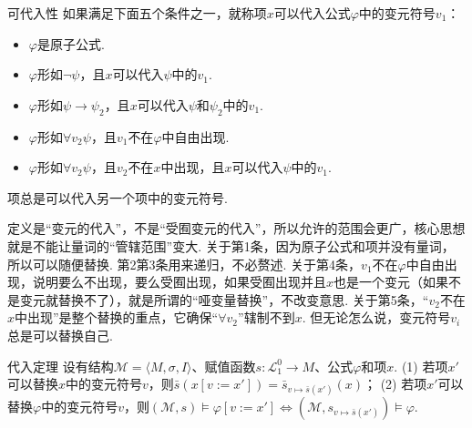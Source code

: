 \begin{definition}{可代入性}
    如果满足下面五个条件之一，就称项\(x\)可以代入公式\(\varphi\)中的变元符号\(v_1\)：
    \begin{itemize}
        \item \(\varphi\)是原子公式.
        \item \(\varphi\)形如\(\neg \psi\)，且\(x\)可以代入\(\psi\)中的\(v_1\).
        \item \(\varphi\)形如\(\psi \to \psi_2\)，且\(x\)可以代入\(\psi\)和\(\psi_2\)中的\(v_1\).
        \item \(\varphi\)形如\(\forall v_2 \psi\)，且\(v_1\)不在\(\varphi\)中自由出现.
        \item \(\varphi\)形如\(\forall v_2 \psi\)，且\(v_2\)不在\(x\)中出现，且\(x\)可以代入\(\psi\)中的\(v_1\).
    \end{itemize}
    项总是可以代入另一个项中的变元符号.
\end{definition}

定义是“变元的代入”，不是“受囿变元的代入”，所以允许的范围会更广，核心思想就是不能让量词的“管辖范围”变大. 关于第1条，因为原子公式和项并没有量词，所以可以随便替换. 第2第3条用来递归，不必赘述. 关于第4条，\(v_1\)不在\(\varphi\)中自由出现，说明要么不出现，要么受囿出现，如果受囿出现并且\(x\)也是一个变元（如果不是变元就替换不了），就是所谓的“哑变量替换”，不改变意思. 关于第5条，“\(v_2\)不在\(x\)中出现”是整个替换的重点，它确保“\(\forall v_2\)”辖制不到\(x\). 但无论怎么说，变元符号\(v_i\)总是可以替换自己.


\begin{theorem}{代入定理}
    设有结构\(\mathcal{M} = \langle M, \sigma, I \rangle\)、赋值函数\(s:\mathcal{L}_1^0 \to M\)、公式\(\varphi\)和项\(x\). \newline
    (1) 若项\(x'\)可以替换\(x\)中的变元符号\(v\)，则\(\bar s(x[v:=x'])=\bar s_{v \mapsto \bar s(x')}(x)\)；\newline
    (2) 若项\(x'\)可以替换\(\varphi\)中的变元符号\(v\)，则\((\mathcal{M}, s) \vDash \varphi[v:=x'] \Longleftrightarrow (\mathcal{M}, s_{v \mapsto \bar s(x')}) \vDash \varphi\).
\end{theorem}

